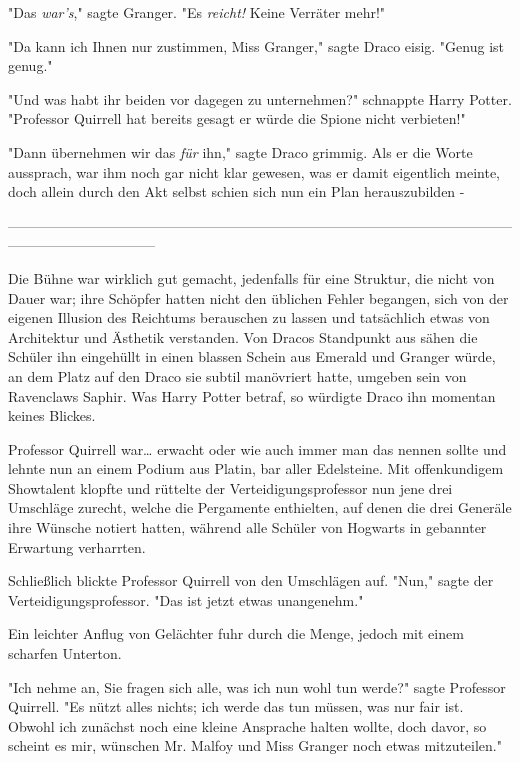 {"Das \emph{war's}," sagte Granger. "Es \emph{reicht!} Keine Verräter mehr!"

"Da kann ich Ihnen nur zustimmen, Miss Granger," sagte Draco eisig. "Genug ist genug."

"Und was habt ihr beiden vor dagegen zu unternehmen?" schnappte Harry Potter. "Professor Quirrell hat bereits gesagt er würde die Spione nicht verbieten!"

"Dann übernehmen wir das \emph{für} ihn," sagte Draco grimmig. Als er die Worte aussprach, war ihm noch gar nicht klar gewesen, was er damit eigentlich meinte, doch allein durch den Akt selbst schien sich nun ein Plan herauszubilden -

--------------------------------------------------------------------------------------------------------------------------------------------

Die Bühne war wirklich gut gemacht, jedenfalls für eine Struktur, die nicht von Dauer war; ihre Schöpfer hatten nicht den üblichen Fehler begangen, sich von der eigenen Illusion des Reichtums berauschen zu lassen und tatsächlich etwas von Architektur und Ästhetik verstanden. Von Dracos Standpunkt aus sähen die Schüler ihn eingehüllt in einen blassen Schein aus Emerald und Granger würde, an dem Platz auf den Draco sie subtil manövriert hatte, umgeben sein von Ravenclaws Saphir. Was Harry Potter betraf, so würdigte Draco ihn momentan keines Blickes.

Professor Quirrell war… erwacht oder wie auch immer man das nennen sollte und lehnte nun an einem Podium aus Platin, bar aller Edelsteine. Mit offenkundigem Showtalent klopfte und rüttelte der Verteidigungsprofessor nun jene drei Umschläge zurecht, welche die Pergamente enthielten, auf denen die drei Generäle ihre Wünsche notiert hatten, während alle Schüler von Hogwarts in gebannter Erwartung verharrten.

Schließlich blickte Professor Quirrell von den Umschlägen auf. "Nun," sagte der Verteidigungsprofessor. "Das ist jetzt etwas unangenehm."

Ein leichter Anflug von Gelächter fuhr durch die Menge, jedoch mit einem scharfen Unterton.

"Ich nehme an, Sie fragen sich alle, was ich nun wohl tun werde?" sagte Professor Quirrell. "Es nützt alles nichts; ich werde das tun müssen, was nur fair ist. Obwohl ich zunächst noch eine kleine Ansprache halten wollte, doch davor, so scheint es mir, wünschen Mr. Malfoy und Miss Granger noch etwas mitzuteilen."

}

